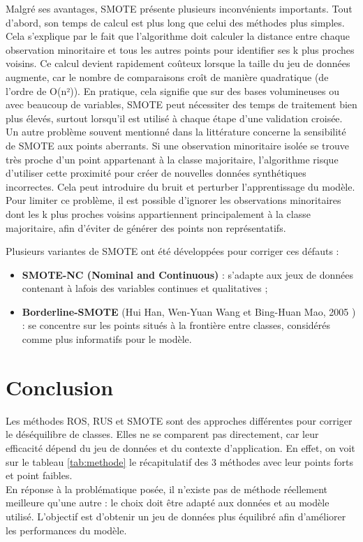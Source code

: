 \documentclass{article}
\begin{document}
Malgré ses avantages, SMOTE présente plusieurs inconvénients importants. Tout d’abord, son temps de calcul est plus long que celui des méthodes plus simples. Cela s’explique par le fait que l’algorithme doit calculer la distance
entre chaque observation minoritaire et tous les autres points pour identifier ses k plus proches voisins. Ce calcul devient rapidement coûteux lorsque la taille du jeu de données augmente, car le nombre de comparaisons croît de manière quadratique (de l’ordre de O(n²)). En pratique, cela signifie que sur des bases volumineuses ou avec beaucoup de variables, SMOTE peut nécessiter des temps de traitement bien plus élevés,
surtout lorsqu’il est utilisé à chaque étape d’une validation croisée.
Un autre problème souvent mentionné dans la littérature concerne la sensibilité de SMOTE aux points aberrants. Si une observation minoritaire isolée se trouve très proche d’un point appartenant à la classe majoritaire, l’algorithme risque d’utiliser cette proximité
pour créer de nouvelles données synthétiques incorrectes. Cela peut introduire du bruit et perturber l’apprentissage du modèle. Pour limiter ce problème, il est possible d’ignorer les observations minoritaires dont les k plus proches voisins appartiennent principalement
à la classe majoritaire, afin d’éviter de générer des points non représentatifs.\medskip


Plusieurs variantes de SMOTE ont été développées pour corriger ces défauts : 
\begin{itemize}
    \item \textbf{SMOTE-NC (Nominal and Continuous)} : s’adapte aux jeux de données contenant à lafois des variables continues et qualitatives ;
    \item \textbf{Borderline-SMOTE} (Hui Han, Wen-Yuan Wang et Bing-Huan Mao, 2005 ) : se concentre sur les points situés à la frontière entre classes, considérés comme plus informatifs pour le modèle.
\end{itemize}

\section{Conclusion}

Les méthodes ROS, RUS et SMOTE sont des approches différentes pour corriger le déséquilibre de classes. Elles ne se comparent pas directement, car leur efficacité dépend du jeu de données et du contexte d’application. 
En effet, on voit sur le tableau \ref{tab:methode} le récapitulatif des 3 méthodes avec leur points forts et point faibles. \\
En réponse à la problématique posée, il n’existe pas de méthode réellement meilleure qu'une autre : le choix doit être adapté aux données et au modèle utilisé. 
L’objectif est d’obtenir un jeu de données plus équilibré afin d’améliorer les performances du modèle.\\
\end{document}
